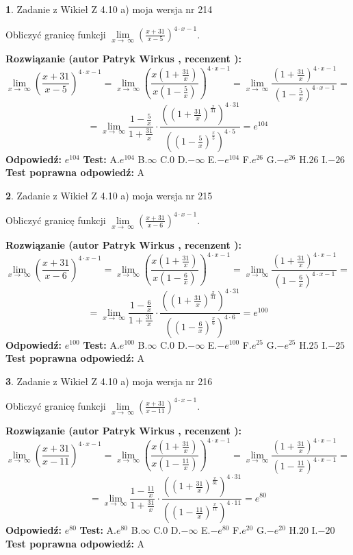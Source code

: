 \documentclass[12pt, a4paper]{article}
\theoremstyle{definition} %
\newtheorem{zad}{}
\newcommand{\zadStart}[1]{\begin{zad}#1\newline}
\newcommand{\zadStop}{\end{zad}}
\newcommand{\rozwStart}[2]{\noindent \textbf{Rozwiązanie (autor #1 , recenzent #2): }\newline}
\newcommand{\rozwStop}{\newline}
\newcommand{\odpStart}{\noindent \textbf{Odpowiedź:}\newline}
\newcommand{\odpStop}{\newline}
\newcommand{\testStart}{\noindent \textbf{Test:}\newline}
\newcommand{\testStop}{\newline}
\newcommand{\kluczStart}{\noindent \textbf{Test poprawna odpowiedź:}\newline}
\newcommand{\kluczStop}{\newline}
\begin{document}
\zadStart{Zadanie z Wikieł Z 4.10 a) moja wersja nr 214}

Obliczyć granicę funkcji  $\lim\limits_{x\to\ \infty}(\frac{x+31}{x-5})^{4\cdot x-1}$.
\zadStop
\rozwStart{Patryk Wirkus}{}
$$\lim\limits_{x\to\ \infty}(\frac{x+31}{x-5})^{4\cdot x-1} = \lim\limits_{x\to\ \infty}(\frac{x(1+\frac{31}{x})}{x(1-\frac{5}{x})})^{4\cdot x-1}=\lim\limits_{x\to\ \infty}\frac{(1+\frac{31}{x})^{4\cdot x-1}}{(1-\frac{5}{x})^{4\cdot x-1}}=$$
$$=\lim\limits_{x\to\ \infty}\frac{1-\frac{5}{x}}{1+\frac{31}{x}}\cdot\frac{((1+\frac{31}{x})^{\frac{x}{31}})^{4\cdot31}}{((1-\frac{5}{x})^{\frac{x}{5}})^{4\cdot5}}=e^{104}$$
\rozwStop
\odpStart
$e^{104}$
\odpStop
\testStart
A.$e^{104}$ B.$\infty$ C.$0$ D.$-\infty$ E.$-e^{104}$
F.$e^{26}$ G.$-e^{26}$
H.$26$
I.$-26$
\testStop
\kluczStart
A
\kluczStop



\zadStart{Zadanie z Wikieł Z 4.10 a) moja wersja nr 215}

Obliczyć granicę funkcji  $\lim\limits_{x\to\ \infty}(\frac{x+31}{x-6})^{4\cdot x-1}$.
\zadStop
\rozwStart{Patryk Wirkus}{}
$$\lim\limits_{x\to\ \infty}(\frac{x+31}{x-6})^{4\cdot x-1} = \lim\limits_{x\to\ \infty}(\frac{x(1+\frac{31}{x})}{x(1-\frac{6}{x})})^{4\cdot x-1}=\lim\limits_{x\to\ \infty}\frac{(1+\frac{31}{x})^{4\cdot x-1}}{(1-\frac{6}{x})^{4\cdot x-1}}=$$
$$=\lim\limits_{x\to\ \infty}\frac{1-\frac{6}{x}}{1+\frac{31}{x}}\cdot\frac{((1+\frac{31}{x})^{\frac{x}{31}})^{4\cdot31}}{((1-\frac{6}{x})^{\frac{x}{6}})^{4\cdot6}}=e^{100}$$
\rozwStop
\odpStart
$e^{100}$
\odpStop
\testStart
A.$e^{100}$ B.$\infty$ C.$0$ D.$-\infty$ E.$-e^{100}$
F.$e^{25}$ G.$-e^{25}$
H.$25$
I.$-25$
\testStop
\kluczStart
A
\kluczStop



\zadStart{Zadanie z Wikieł Z 4.10 a) moja wersja nr 216}

Obliczyć granicę funkcji  $\lim\limits_{x\to\ \infty}(\frac{x+31}{x-11})^{4\cdot x-1}$.
\zadStop
\rozwStart{Patryk Wirkus}{}
$$\lim\limits_{x\to\ \infty}(\frac{x+31}{x-11})^{4\cdot x-1} = \lim\limits_{x\to\ \infty}(\frac{x(1+\frac{31}{x})}{x(1-\frac{11}{x})})^{4\cdot x-1}=\lim\limits_{x\to\ \infty}\frac{(1+\frac{31}{x})^{4\cdot x-1}}{(1-\frac{11}{x})^{4\cdot x-1}}=$$
$$=\lim\limits_{x\to\ \infty}\frac{1-\frac{11}{x}}{1+\frac{31}{x}}\cdot\frac{((1+\frac{31}{x})^{\frac{x}{31}})^{4\cdot31}}{((1-\frac{11}{x})^{\frac{x}{11}})^{4\cdot11}}=e^{80}$$
\rozwStop
\odpStart
$e^{80}$
\odpStop
\testStart
A.$e^{80}$ B.$\infty$ C.$0$ D.$-\infty$ E.$-e^{80}$
F.$e^{20}$ G.$-e^{20}$
H.$20$
I.$-20$
\testStop
\kluczStart
A
\kluczStop
\end{document}
